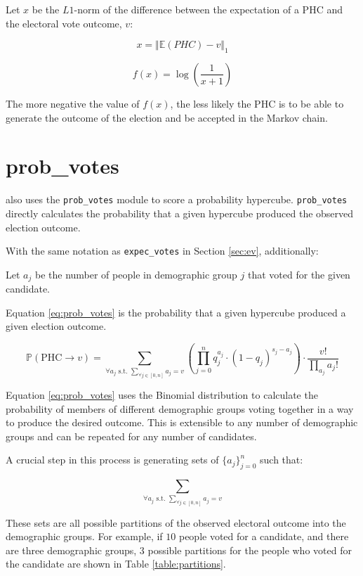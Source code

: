 Let $x$ be the $L1$-norm of the difference between the expectation of a PHC and the electoral vote outcome, $v$:

$$x = \Vert \mathbb{E}(PHC) - v \Vert_1$$

\begin{equation}
  f(x) = \log\left(\frac{1}{x + 1}\right)
  \label{eq:asymptote}
\end{equation}

The more negative the value of $f(x)$, the less likely the PHC is to be able to generate the outcome of the election and be accepted in the Markov chain.


\section{prob\_votes}
\label{sec:pv}

 also uses the \texttt{prob\_votes} module to score a probability hypercube. \texttt{prob\_votes} directly calculates the probability that a given hypercube produced the observed election outcome.

With the same notation as \texttt{expec\_votes} in Section \ref{sec:ev}, additionally:

Let $a_j$ be the number of people in demographic group $j$ that voted for the given candidate.

Equation \ref{eq:prob_votes} is the probability that a given hypercube produced a given election outcome.

\begin{equation}
 \mathbb{P}(\text{PHC} \rightarrow v) =\sum_{\forall a_j \text{ s.t. } \sum_{\forall j \in [0, n]} a_j = v} \left(\prod_{j = 0}^n q_j^{a_j} \cdot (1 - q_j)^{s_j - a_j}\right) \cdot \frac{v!}{\prod_{a_j}a_j!}
 \label{eq:prob_votes}
\end{equation}

Equation \ref{eq:prob_votes} uses the Binomial distribution to calculate the probability of members of different demographic groups voting together in a way to produce the desired outcome. This is extensible to any number of demographic groups and can be repeated for any number of candidates.

A crucial step in this process is generating sets of $\{a_j\}_{j=0}^n$ such that:

$$\sum_{\forall a_j \text{ s.t. } \sum_{\forall j \in [0, n]} a_j = v}$$

These sets are all possible partitions of the observed electoral outcome into the demographic groups. For example, if $10$ people voted for a candidate, and there are three demographic groups, $3$ possible partitions for the people who voted for the candidate are shown in Table \ref{table:partitions}.

